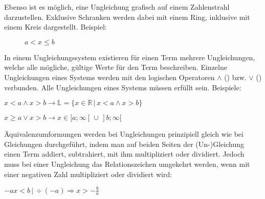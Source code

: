 \pagebreak


Ebenso ist es m\"{o}glich, eine Ungleichung grafisch auf einem Zahlenstrahl darzustellen. Exklusive Schranken werden dabei mit einem Ring, inklusive mit einem Kreis dargestellt. Beispiel:

\begin{figure}[h!]
	\caption*{$a < x \leq b$}
\end{figure}


In einem Ungleichungssystem existieren f\"{u}r einen Term mehrere Ungleichungen, welche alle m\"{o}gliche, g\"{u}ltige Werte f\"{u}r den Term beschreiben. Einzelne Ungleichungen eines Systems werden mit den logischen Operatoren $\land$ () bzw. $\lor$ () verbunden. Alle Ungleichungen eines Systems m\"{u}ssen erf\"{u}llt sein. Beispiele:

$x < a \land x > b \rightarrow \mathbb{L} = \{x \in \mathbb{R}\,|\,x < a \land x > b\}$

$x \geq a \lor x > b \rightarrow x \in [a;\infty[\, \cup \,]b;\infty[$


\"{A}quivalenzumformungen werden bei Ungleichungen prinzipiell gleich wie bei Gleichungen durchgef\"{u}hrt, indem man auf beiden Seiten der (Un-)Gleichung einen Term addiert, subtrahiert, mit ihm multipliziert oder dividiert. Jedoch muss bei einer Ungleichung das Relationszeichen umgekehrt werden, wenn mit einer negativen Zahl multipliziert oder dividiert wird:

$-ax < b \,|\, \div (-a) \Rightarrow x > -\frac{b}{a}$

